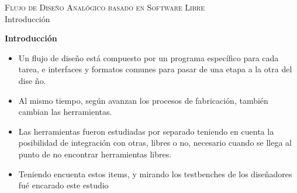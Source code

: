 \documentclass[ps,clariphy]{prosper}
\begin{document}
\begin{slide}{ \textsc{{\tiny  Flujo de Dise\~no Anal\'ogico basado en Software Libre}}\\ Introducci\'on}
  \vspace{-0.5cm}
  \tiny{
    \textbf{Introducci\'on}
    \begin{itemize}
	\item Un flujo de dise\~no est\'a compuesto por un programa espec\'ifico para cada tarea, e interfaces y formatos comunes para pasar de una etapa a la otra del dise \~no.
	\item Al mismo tiempo, seg\'un avanzan los procesos de fabricaci\'on, tambi\'en cambian las herramientas.
	\item Las herramientas fueron estudiadas por separado teniendo en cuenta la posibilidad de integraci\'on con otras, libres o no, necesario cuando se llega al punto de no encontrar herramientas libres.
	\item Teniendo encuenta estos items, y mirando los testbenches de los dise\~nadores fu\'e encarado este estudio
    \end{itemize}
  }
\end{slide}
\end{document}
